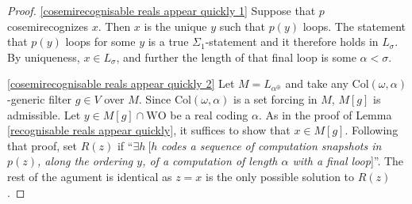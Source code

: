 \documentclass[a4paper,11pt]{amsart}
\theoremstyle{definition}
\newcommand{\WO}{\mathrm{WO}}
\renewcommand{\Col}{\mathrm{Col}}
\newtheorem{lemma}[fact]{Lemma}
\newtheorem*{problem A}{Problem 1}
\newtheorem*{problem B}{Problem 2}
\theoremstyle{remark}
\begin{document}
\begin{proof} 
\ref{cosemirecognisable reals appear quickly 1} 
Suppose that $p$ cosemirecognizes $x$.  Then $x$ is the unique $y$ such that $p(y)$ loops. 
The statement that $p(y)$ loops for some $y$ is a true $\Sigma_1$-statement and it therefore holds in $L_\sigma$. 
By uniqueness, $x\in L_\sigma$, and further the length of that final loop is some $\alpha <\sigma$.

\ref{cosemirecognisable reals appear quickly 2} 
Let $M=L_{\alpha^\oplus}$ and take any $\Col(\omega,\alpha)$-generic filter $g\in V$ over $M$. 
Since $\Col(\omega,\alpha)$ is a set forcing in $M$, $M[g]$ is admissible. 
Let $y\in M[g]\cap \WO$ be a real coding $\alpha$. 
As in the proof of Lemma \ref{recognisable reals appear quickly}, it suffices to show that $x\in M[g]$.  Following that proof, set $R(z)$ if ``$\exists h\ [ h $ {\em  codes a  sequence of computation snapshots in $p(z)$, along the ordering $y$, 
of a 
computation of length 
$\alpha$ with a final loop}]''.
The rest of the agument is identical as $z=x$ is the only possible solution to $R(z)$.
\end{proof} 
\end{document}
